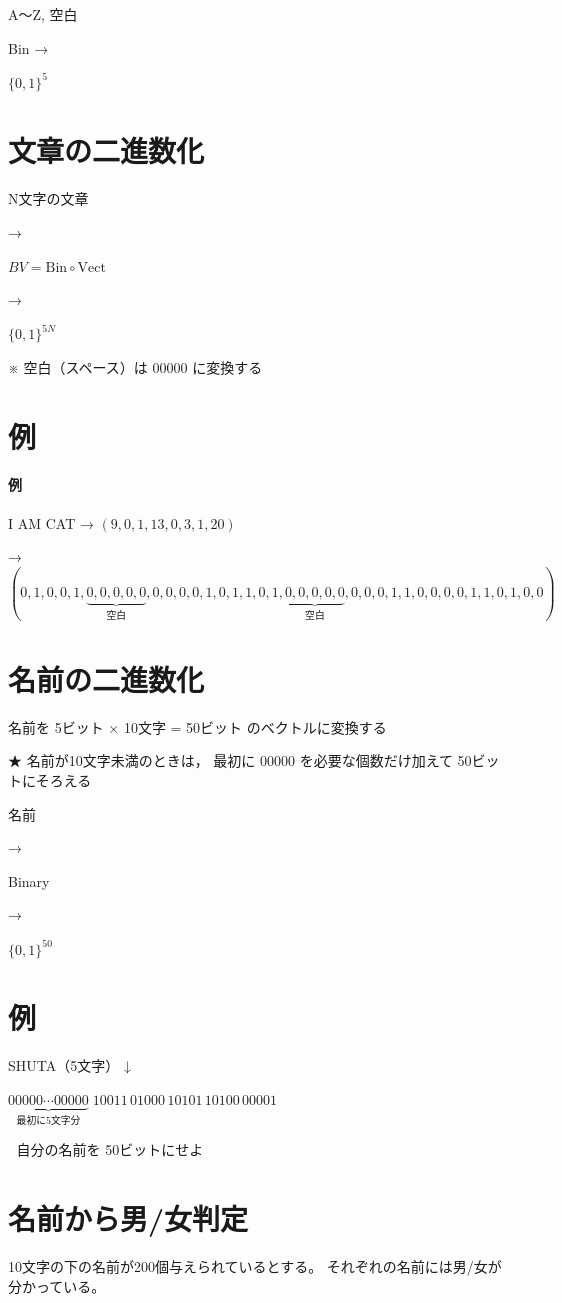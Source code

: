 \documentclass[uplatex,dvipdfmx,11pt,a4paper,openany]{bxjsbook}
\begin{document}
A〜Z, 空白

Bin
→

\( \{0, 1\}^5 \)

\section{文章の二進数化}
N文字の文章

→

\( BV = \mathrm{Bin} \circ \mathrm{Vect} \)

→

\( \{0, 1\}^{5N} \)

※ 空白（スペース）は 00000 に変換する

\section{例}
\paragraph{例}
I AM CAT
→
\( (9, 0, 1, 13, 0, 3, 1, 20) \)

→
\( (0,1,0,0,1, \underbrace{0,0,0,0,0}_{\text{空白}}, 0,0,0,0,1, 0,1,1,0,1, \underbrace{0,0,0,0,0}_{\text{空白}}, 0,0,0,1,1, 0,0,0,0,1, 1,0,1,0,0) \)


\section{名前の二進数化}
名前を 5ビット × 10文字 = 50ビット のベクトルに変換する

★ 名前が10文字未満のときは，\allowbreak{} 
最初に 00000 を必要な個数だけ加えて 50ビットにそろえる

名前

→

Binary

→

\( \{0,1\}^{50} \)

\section{例}
SHUTA（5文字）\allowbreak{} 
        ↓\allowbreak{} 

        \( \underbrace{00000\cdots00000}_{\text{最初に5文字分}}
        \;10011\,01000\,10101\,10100\,00001 \)

📝 自分の名前を 50ビットにせよ

\section{名前から男/女判定}
10文字の下の名前が200個与えられているとする。\allowbreak{} 
        それぞれの名前には男/女が分かっている。
\end{document}
